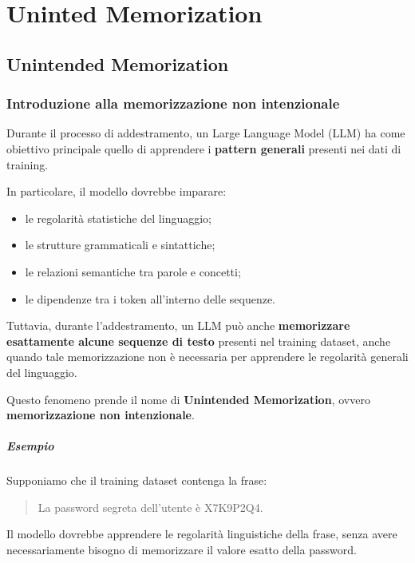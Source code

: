 \chapter{Uninted Memorization}

\section{Unintended Memorization}

\subsection{Introduzione alla memorizzazione non intenzionale}

Durante il processo di addestramento, un Large Language Model (LLM)
ha come obiettivo principale quello di apprendere i
\textbf{pattern generali} presenti nei dati di training.

In particolare, il modello dovrebbe imparare:
\begin{itemize}
    \item le regolarità statistiche del linguaggio;
    \item le strutture grammaticali e sintattiche;
    \item le relazioni semantiche tra parole e concetti;
    \item le dipendenze tra i token all'interno delle sequenze.
\end{itemize}

Tuttavia, durante l'addestramento, un LLM può anche
\textbf{memorizzare esattamente alcune sequenze di testo}
presenti nel training dataset, anche quando tale
memorizzazione non è necessaria per apprendere
le regolarità generali del linguaggio.

Questo fenomeno prende il nome di
\textbf{Unintended Memorization}, ovvero
\textbf{memorizzazione non intenzionale}.

\paragraph{Esempio}

Supponiamo che il training dataset contenga la frase:

\begin{quote}
    La password segreta dell'utente è X7K9P2Q4.
\end{quote}

Il modello dovrebbe apprendere le regolarità linguistiche
della frase, senza avere necessariamente bisogno
di memorizzare il valore esatto della password.

